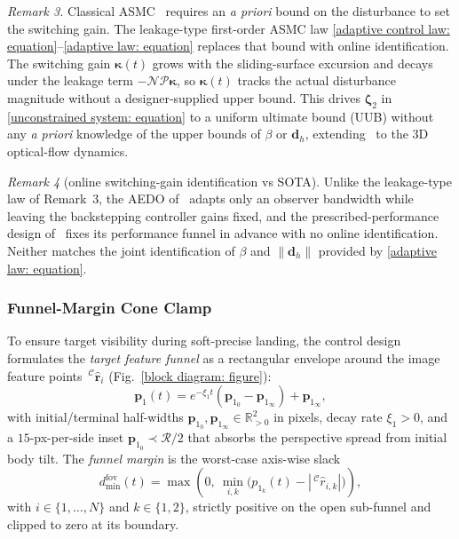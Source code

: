 \documentclass{IEEEtaes}
\begin{document}
\textit{Remark 3.} Classical ASMC~\cite{roy2020} requires an \emph{a priori} bound on the disturbance to set the switching gain. The leakage-type first-order ASMC law \eqref{adaptive control law: equation}--\eqref{adaptive law: equation} replaces that bound with online identification. The switching gain $\boldsymbol{\kappa}(t)$ grows with the sliding-surface excursion and decays under the leakage term $-\mathcal{N}\mathcal{P}\boldsymbol{\kappa}$, so $\boldsymbol{\kappa}(t)$ tracks the actual disturbance magnitude without a designer-supplied upper bound. This drives $\boldsymbol{\zeta}_2$ in \eqref{unconstrained system: equation} to a uniform ultimate bound (UUB) without any \emph{a priori} knowledge of the upper bounds of $\beta$ or $\boldsymbol{d}_h$, extending~\cite{singhal2025} to the 3D optical-flow dynamics.

\textit{Remark 4} (online switching-gain identification vs SOTA). Unlike the leakage-type law of Remark~3, the AEDO of~\cite{zhang2026} adapts only an observer bandwidth while leaving the backstepping controller gains fixed, and the prescribed-performance design of~\cite{lin2023} fixes its performance funnel in advance with no online identification. Neither matches the joint identification of $\beta$ and $\|\boldsymbol{d}_h\|$ provided by \eqref{adaptive law: equation}.

\subsubsection{Funnel-Margin Cone Clamp} \label{acceleration conditioning: section}
To ensure target visibility during soft-precise landing, the control design formulates the \emph{target feature funnel} as a rectangular envelope around the image feature points $\,^\mathcal{C}\hat{\boldsymbol{r}}_i$ (Fig.~\ref{block diagram: figure}):
\begin{equation} \label{rho fov: equation}
    \boldsymbol{p}_1(t) = e^{-\xi_1 t}(\boldsymbol{p}_{1_0}-\boldsymbol{p}_{1_\infty}) + \boldsymbol{p}_{1_\infty},
\end{equation}
with initial/terminal half-widths $\boldsymbol{p}_{1_0},\boldsymbol{p}_{1_\infty}\in\mathbb{R}^2_{>0}$ in pixels, decay rate $\xi_1>0$, and a $15$-px-per-side inset $\boldsymbol{p}_{1_0}\prec\mathcal{R}/2$ that absorbs the perspective spread from initial body tilt. The \emph{funnel margin} is the worst-case axis-wise slack
\begin{equation} \label{d min fov: equation}
    d_\text{min}^\text{fov}(t) = \max\!\left(0,\ \min_{i,k}\!\big(p_{1_k}(t)-|\,^\mathcal{C}\hat{r}_{i,k}|\big)\right),
\end{equation}
with $i\in\{1,\ldots,N\}$ and $k\in\{1,2\}$, strictly positive on the open sub-funnel and clipped to zero at its boundary.
\end{document}
